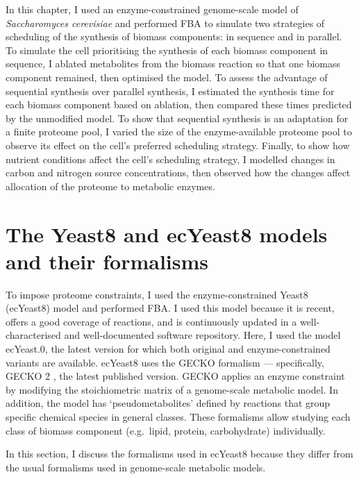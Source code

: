 In this chapter, I used an enzyme-constrained genome-scale model of \textit{Saccharomyces cerevisiae} and performed FBA to simulate two strategies of scheduling of the synthesis of biomass components: in sequence and in parallel.
To simulate the cell prioritising the synthesis of each biomass component in sequence, I ablated metabolites from the biomass reaction so that one biomass component remained, then optimised the model.
To assess the advantage of sequential synthesis over parallel synthesis, I estimated the synthesis time for each biomass component based on ablation, then compared these times predicted by the unmodified model.
To show that sequential synthesis is an adaptation for a finite proteome pool, I varied the size of the enzyme-available proteome pool to observe its effect on the cell's preferred scheduling strategy.
Finally, to show how nutrient conditions affect the cell's scheduling strategy, I modelled changes in carbon and nitrogen source concentrations, then observed how the changes affect allocation of the proteome to metabolic enzymes.


\section{The Yeast8 and ecYeast8 models and their formalisms}
\label{sec:model-yeast8}

To impose proteome constraints, I used the enzyme-constrained Yeast8 (ecYeast8) model \parencite{luConsensusCerevisiaeMetabolic2019} and performed FBA.
I used this model because it is recent, offers a good coverage of reactions, and is continuously updated in a well-characterised and well-documented software repository.
Here, I used the model ec\-Yeast.0, the latest version for which both original and enzyme-constrained variants are available.
ecYeast8 uses the GECKO formalism \parencite{sanchezImprovingPhenotypePredictions2017} --- specifically, GECKO 2 \parencite{domenzainReconstructionCatalogueGenomescale2022}, the latest published version.
GECKO applies an enzyme constraint by modifying the stoichiometric matrix of a genome-scale metabolic model.
In addition, the model has `pseudometabolites' defined by reactions that group specific chemical species in general classes.
These formalisms allow studying each class of biomass component (e.g.\ lipid, protein, carbohydrate) individually.

In this section, I discuss the formalisms used in ecYeast8 because they differ from the usual formalisms used in genome-scale metabolic models.


